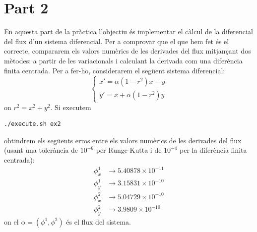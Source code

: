 \documentclass[10pt,a4paper]{article}
\newcommand{\vf}[1]{\boldsymbol{\mathrm{#1}}} %
\theoremstyle{definition}
\theoremstyle{remark}
\begin{document}
\section*{Part 2}
En aquesta part de la pràctica l'objectiu és implementar el càlcul de la diferencial del flux d'un sistema diferencial. Per a comprovar que el que hem fet és el correcte, compararem els valors numèrics de les derivades del flux mitjançant dos mètodes: a partir de les variacionals i calculant la derivada com una diferència finita centrada. Per a fer-ho, considerarem el següent sistema diferencial:
$$
  \begin{cases}
    x'=\alpha (1 - r^2)x -y \\
    y'=x+\alpha (1 - r^2)y
  \end{cases}
$$
on $r^2=x^2+y^2$. Si executem
\begin{lstlisting}[language=Bash]
./execute.sh ex2
\end{lstlisting}
obtindrem els següents erros entre els valors numèrics de les derivades del flux (usant una tolerància de $10^{-6}$ per Runge-Kutta i de $10^{-4}$ per la diferència finita centrada):
\begin{align*}
  \phi^1_x & \to 5.40878\times 10^{-11} \\
  \phi^1_y & \to 3.15831\times 10^{-10} \\
  \phi^2_x & \to 5.04729\times 10^{-10} \\
  \phi^2_y & \to 3.9809\times 10^{-10}
\end{align*}
on el $\vf\phi=(\phi^1,\phi^2)$ és el flux del sistema.
\end{document}
